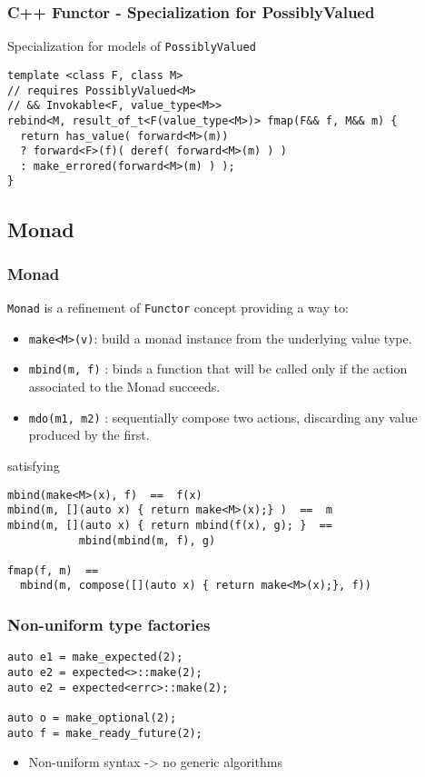\documentclass[xcolor=dvipsnames]{beamer}
\newcommand{\cpp}[1]{\lstinline{#1}}
\begin{document}
\begin{frame}[fragile]
\frametitle{C++ Functor - Specialization for PossiblyValued}
       
Specialization for models of \cpp{PossiblyValued}       

\begin{lstlisting}
template <class F, class M>
// requires PossiblyValued<M> 
// && Invokable<F, value_type<M>>
rebind<M, result_of_t<F(value_type<M>)> fmap(F&& f, M&& m) {
  return has_value( forward<M>(m))
  ? forward<F>(f)( deref( forward<M>(m) ) )
  : make_errored(forward<M>(m) ) );
}
\end{lstlisting}
         
\end{frame}
\subsection{Monad}
\begin{frame}[fragile]
\frametitle{Monad}

\cpp{Monad} is a refinement of \cpp{Functor} concept  providing a way to:

\begin{itemize}
  \item \cpp{make<M>(v)}: build a monad instance from the underlying value type.
  \item \cpp{mbind(m, f)} : binds a function that will be called only if the action associated to the Monad succeeds.
  \item \cpp{mdo(m1, m2)} : sequentially compose two actions, discarding any value produced by the first.
\end{itemize}

satisfying

\begin{lstlisting}
mbind(make<M>(x), f)  ==  f(x)
mbind(m, [](auto x) { return make<M>(x);} )  ==  m
mbind(m, [](auto x) { return mbind(f(x), g); }  ==  
           mbind(mbind(m, f), g)

fmap(f, m)  ==  
  mbind(m, compose([](auto x) { return make<M>(x);}, f))
\end{lstlisting}
\end{frame}
\begin{frame}[fragile]
\frametitle{Non-uniform type factories}

\begin{lstlisting}
auto e1 = make_expected(2); 
auto e2 = expected<>::make(2); 
auto e2 = expected<errc>::make(2);

auto o = make_optional(2); 
auto f = make_ready_future(2); 
\end{lstlisting}

\begin{itemize}
  \item Non-uniform syntax -> no generic algorithms 
\end{itemize}

\end{frame}
\end{document}
